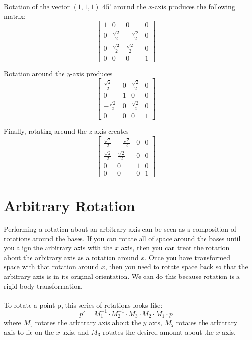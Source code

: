 \documentclass[10pt,twocolumn]{article}
\begin{document}
\begin{framed}
Rotation of the vector $ (1, 1, 1)$ $45^{\circ}$ around the $x$-axis produces the following matrix:
\[ \begin{bmatrix}
1 & 0 & 0 & 0 \\
0 & \frac{\sqrt2}{2} & -\frac{\sqrt2}{2} & 0 \\
0 & \frac{\sqrt2}{2} & \frac{\sqrt2}{2} & 0 \\
0 & 0 & 0 & 1 
\end{bmatrix} \]

Rotation around the $y$-axis produces
\[ \begin{bmatrix}
\frac{\sqrt2}{2} & 0 & \frac{\sqrt2}{2} & 0 \\
0 & 1 & 0 & 0 \\
-\frac{\sqrt2}{2} & 0 & \frac{\sqrt2}{2} & 0 \\
0 & 0 & 0 & 1 
\end{bmatrix} \]

Finally, rotating around the $z$-axis creates
\[ \begin{bmatrix}
\frac{\sqrt2}{2} & -\frac{\sqrt2}{2} & 0 & 0 \\
\frac{\sqrt2}{2} & \frac{\sqrt2}{2} & 0 & 0 \\
0 & 0 & 1 & 0 \\
0 & 0 & 0 & 1 
\end{bmatrix} \]

\end{framed}

\section{Arbitrary Rotation}
Performing a rotation about an arbitrary axis can be seen as a composition of rotations around the bases. If you can rotate all of space around the bases until you align the arbitrary axis with the $x$ axis, then you can treat the rotation about the arbitrary axis as a rotation around $x$. Once you have transformed space with that rotation around $x$, then you need to rotate space back so that the arbitrary axis is in its original orientation. We can do this because rotation is a rigid-body transformation.\\\\
To rotate a point p, this series of rotations looks like:
\[p' = M^{-1}_1\cdot M^{-1}_2 \cdot M_3 \cdot M_2 \cdot M_1 \cdot p\]
where $M_1$ rotates the arbitrary axis about the $y$ axis, $M_2$ rotates the arbitrary axis to lie on the $x$ axis, and $M_3$ rotates the desired amount about the $x$ axis.
\end{document}
